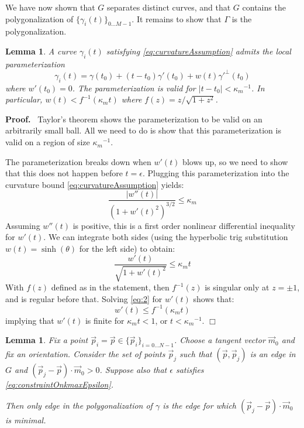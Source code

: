 \documentclass{article}
\newenvironment{proof}{
  \noindent\textbf{Proof.}\ }{\hspace*{\fill}
  \begin{math}\Box\end{math}\medskip}
\newtheorem{lemma}[cntr]{Lemma}
\numberwithin{cntr}{section}
\numberwithin{equation}{section}
\newcommand{\abs}[1]{\left| #1 \right|}%
\newcommand{\vp}[0]{{\vec{p}}}
\newcommand{\vm}[0]{{\vec{m}}}
\newcommand{\Oto}[1]{{0 \ldots #1-1}}
\newcommand{\OtoN}{{0 \ldots N-1}}
\newcommand{\pointData}{{ \{ \vp_{i} \}_{i=\OtoN} }}
\newcommand{\curveSet}{{ \{ \gamma_i(t) \}_{\Oto{M}}}}
\newcommand{\curvemax}{{\kappa_{m}}}
\newcommand{\curvemaxi}{{\curvemax^{-1}}}
\begin{document}
We have now shown that $G$ separates distinct curves, and that $G$ contains the polygonalization of $\curveSet$. It remains to show that $\Gamma$ is the polygonalization.

\begin{lemma}
  \label{lem:localGraphParameterization}
  A curve $\gamma_{i}(t)$ satisfying \eqref{eq:curvatureAssumption} admits the local parameterization
  \begin{equation}
    \label{eq:localGraphParameterization}
    \gamma_{i}(t) = \gamma(t_{0}) + (t-t_{0})\gamma'(t_{0}) + w(t) \gamma'^{\perp}(t_{0})
  \end{equation}
  where $w'(t_{0})=0$. The parameterization is valid for $\abs{t-t_{0}} < \curvemaxi$. In particular, $w(t) < f^{-1}(\curvemax t) $ where $f(z)=z / \sqrt{1+z^{2}}$.
\end{lemma}

\begin{proof}
  Taylor's theorem shows the parameterization to be valid on an arbitrarily small ball. All we need to do is show that this parameterization is valid on a region of size $\curvemaxi$.

  The parameterization breaks down when $w'(t)$ blows up, so we need to show that this does not happen before $t=\epsilon$. Plugging this parameterization into the curvature bound \eqref{eq:curvatureAssumption} yields:
  \begin{equation*}
    \frac{ \abs{w''(t)} }{(1+w'(t)^{2})^{3/2}} \leq \curvemax
  \end{equation*}
  Assuming $w''(t)$ is positive, this is a first order nonlinear differential inequality for $w'(t)$. We can integrate both sides (using the hyperbolic trig substitution $w(t)=\sinh(\theta)$ for the left side) to obtain:
  \begin{equation}
    \label{eq:2}
    \frac{w'(t)}{\sqrt{1+w'(t)^{2}}} \leq \curvemax t
  \end{equation}
  With $f(z)$ defined as in the statement, then $f^{-1}(z)$ is singular only at $z=\pm 1$, and is regular before that. Solving \eqref{eq:2} for $w'(t)$ shows that:
  \begin{equation*}
    w'(t) \leq f^{-1}(\curvemax t)
  \end{equation*}
  implying that $w'(t)$ is finite for $\curvemax t < 1$, or $t < \curvemaxi$.
\end{proof}

\begin{lemma}
  \label{lem:closestTangentPointInAllowedRegionIsCorrect}
  Fix a point $\vp_{i}=\vp \in \pointData$. Choose a tangent vector $\vm_{0}$ and fix an orientation. Consider the set of points $\vp_{j}$ such that $(\vp, \vp_{j})$ is an edge in $G$ and $(\vp_{j} - \vp) \cdot \vm_{0} > 0$. Suppose also that $\epsilon$ satisfies \eqref{eq:constraintOnkmaxEpsilon}.

  Then only edge in the polygonalization of $\gamma$ is the edge for which $(\vp_{j} - \vp) \cdot \vm_{0}$ is minimal.
\end{lemma}
\end{document}
